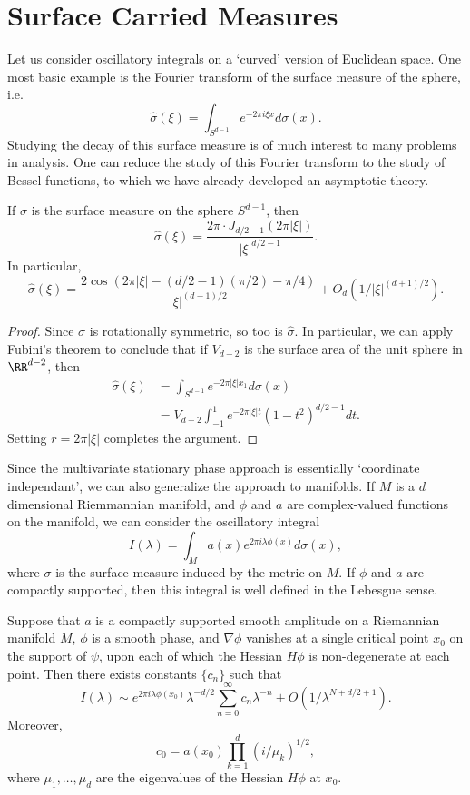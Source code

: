 \section{Surface Carried Measures}

Let us consider oscillatory integrals on a `curved' version of Euclidean space. One most basic example is the Fourier transform of the surface measure of the sphere, i.e.
%
\[ \widehat{\sigma}(\xi) = \int_{S^{d-1}} e^{-2 \pi i \xi x} d\sigma(x). \]
%
Studying the decay of this surface measure is of much interest to many problems in analysis. One can reduce the study of this Fourier transform to the study of Bessel functions, to which we have already developed an asymptotic theory.

\begin{theorem}
  If $\sigma$ is the surface measure on the sphere $S^{d-1}$, then
  \[ \widehat{\sigma}(\xi) = \frac{2\pi \cdot J_{d/2 - 1}(2 \pi |\xi|)}{|\xi|^{d/2 - 1}}. \]
  In particular,
  \[ \widehat{\sigma}(\xi) = \frac{2 \cos(2\pi |\xi| - (d/2 - 1)(\pi/2) - \pi/4)}{|\xi|^{(d-1)/2}} + O_d(1/|\xi|^{(d+1)/2}). \]
\end{theorem}
\begin{proof}
  Since $\sigma$ is rotationally symmetric, so too is $\widehat{\sigma}$. In particular, we can apply Fubini's theorem to conclude that if $V_{d-2}$ is the surface area of the unit sphere in $\RR^{d-2}$, then
  \begin{align*}
    \widehat{\sigma}(\xi) &= \int_{S^{d-1}} e^{-2 \pi |\xi| x_1} d\sigma(x)\\
    &= V_{d-2} \int_{-1}^1 e^{-2 \pi |\xi| t} (1 - t^2)^{d/2-1} dt.
  \end{align*}
  Setting $r = 2 \pi |\xi|$ completes the argument.
\end{proof}

Since the multivariate stationary phase approach is essentially `coordinate independant', we can also generalize the approach to manifolds. If $M$ is a $d$ dimensional Riemmannian manifold, and $\phi$ and $a$ are complex-valued functions on the manifold, we can consider the oscillatory integral
%
\[ I(\lambda) = \int_M a(x) e^{2 \pi i \lambda \phi(x)} d\sigma(x), \]
%
where $\sigma$ is the surface measure induced by the metric on $M$. If $\phi$ and $a$ are compactly supported, then this integral is well defined in the Lebesgue sense.

\begin{theorem}
  Suppose that $a$ is a compactly supported smooth amplitude on a Riemannian manifold $M$, $\phi$ is a smooth phase, and $\nabla \phi$ vanishes at a single critical point $x_0$ on the support of $\psi$, upon each of which the Hessian $H\phi$ is non-degenerate at each point. Then there exists constants $\{ c_n \}$ such that
  \[ I(\lambda) \sim e^{2 \pi i \lambda \phi(x_0)} \lambda^{-d/2} \sum_{n = 0}^\infty c_n \lambda^{-n} + O(1/\lambda^{N + d/2 + 1}). \]
  Moreover,
  \[ c_0 = a(x_0) \prod_{k = 1}^d (i/\mu_k)^{1/2}, \]
  where $\mu_1, \dots, \mu_d$ are the eigenvalues of the Hessian $H\phi$ at $x_0$.
\end{theorem}



